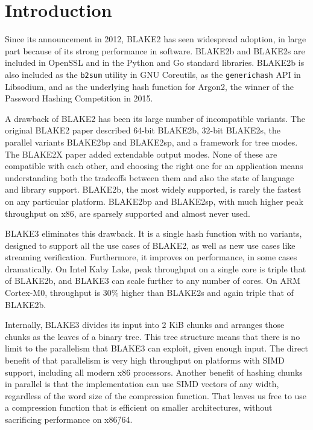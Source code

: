 \documentclass[11pt,notitlepage,a4paper]{article}
\begin{document}
\smallskip

\section{Introduction}\label{sec:intro}

Since its announcement in 2012, BLAKE2 has seen widespread adoption, in large
part because of its strong performance in software. BLAKE2b and BLAKE2s are
included in OpenSSL and in the Python and Go standard libraries. BLAKE2b is
also included as the \texttt{b2sum} utility in GNU Coreutils, as the
\texttt{generichash} API in Libsodium, and as the underlying hash function for
Argon2, the winner of the Password Hashing Competition in 2015.

A drawback of BLAKE2 has been its large number of incompatible variants. The
original BLAKE2 paper described 64-bit BLAKE2b, 32-bit BLAKE2s, the parallel
variants BLAKE2bp and BLAKE2sp, and a framework for tree modes. The BLAKE2X
paper added extendable output modes. None of these are compatible with each
other, and choosing the right one for an application means understanding both
the tradeoffs between them and also the state of language and library support.
BLAKE2b, the most widely supported, is rarely the fastest on any particular
platform. BLAKE2bp and BLAKE2sp, with much higher peak throughput on x86, are
sparsely supported and almost never used.

BLAKE3 eliminates this drawback. It is a single hash function with no variants,
designed to support all the use cases of BLAKE2, as well as new use cases like
streaming verification. Furthermore, it improves on performance, in some cases
dramatically. On Intel Kaby Lake, peak throughput on a single core is triple
that of BLAKE2b, and BLAKE3 can scale further to any number of cores. On ARM
Cortex-M0, throughput is 30\% higher than BLAKE2s and again triple that of
BLAKE2b.

Internally, BLAKE3 divides its input into 2 KiB chunks and arranges those
chunks as the leaves of a binary tree. This tree structure means that there is
no limit to the parallelism that BLAKE3 can exploit, given enough input. The
direct benefit of that parallelism is very high throughput on platforms with
SIMD support, including all modern x86 processors. Another benefit of hashing
chunks in parallel is that the implementation can use SIMD vectors of any
width, regardless of the word size of the compression function. That leaves us
free to use a compression function that is efficient on smaller architectures,
without sacrificing performance on x86\=/64.
\end{document}
